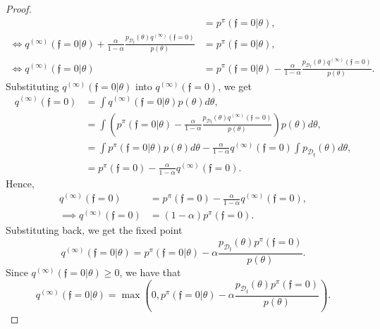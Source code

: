 \documentclass[10pt,a4paper]{amsart}
\newcommand{\MeasuredCISet}{\mathcal{D}_{\feas{}}}
\newcommand{\feas}{\mathfrak{f}}
\begin{document}
\begin{proof}
\begin{align}
    &= p^\pi(\feas{}=0 | \theta), \\
    \iff
    q^{(\infty)}(\feas{}=0 | \theta) + \frac{\alpha}{1-\alpha} \frac{ p_{\MeasuredCISet}(\theta) q^{(\infty)}(\feas{} = 0) }{ p(\theta) }
    &= p^\pi(\feas{}=0 | \theta), \\
    \iff
    q^{(\infty)}(\feas{}=0 | \theta)
    &= p^\pi(\feas{}=0 | \theta) - \frac{\alpha}{1-\alpha} \frac{ p_{\MeasuredCISet}(\theta) q^{(\infty)}(\feas{} = 0) }{ p(\theta) }.
\end{align}
Substituting $q^{(\infty)}(\feas{}=0 | \theta)$ into $q^{(\infty)}(\feas{} = 0)$, we get
\begin{align}
    q^{(\infty)}(\feas{} = 0)
    &= \int q^{(\infty)}(\feas{}=0 | \theta) p(\theta) d\theta, \\
    &= \int \left( p^\pi(\feas{}=0 | \theta) - \frac{\alpha}{1-\alpha} \frac{ p_{\MeasuredCISet}(\theta) q^{(\infty)}(\feas{} = 0) }{ p(\theta) } \right) p(\theta) d\theta, \\
    &= \int p^\pi(\feas{}=0 | \theta) p(\theta) d\theta - \frac{\alpha}{1-\alpha} q^{(\infty)}(\feas{} = 0) \int p_{\MeasuredCISet}(\theta) d\theta, \\
    &= p^\pi(\feas{}=0) - \frac{\alpha}{1-\alpha} q^{(\infty)}(\feas{} = 0).
\end{align}
Hence,
\begin{align}
    q^{(\infty)}(\feas{} = 0)
    &= p^\pi(\feas{}=0) - \frac{\alpha}{1-\alpha} q^{(\infty)}(\feas{} = 0), \\
    \implies
    q^{(\infty)}(\feas{} = 0)
    &= (1-\alpha) p^\pi(\feas{}=0).
\end{align}
Substituting back, we get the fixed point
\begin{equation}
    q^{(\infty)}(\feas{}=0 | \theta)
    = p^\pi(\feas{}=0 | \theta) - \alpha \frac{ p_{\MeasuredCISet}(\theta) p^\pi(\feas{}=0) }{ p(\theta) }.
\end{equation}
Since $q^{(\infty)}(\feas{}=0 | \theta) \geq 0$, we have that
\begin{equation}
    q^{(\infty)}(\feas{}=0 | \theta) = \max \left( 0, p^\pi(\feas{}=0 | \theta) - \alpha \frac{ p_{\MeasuredCISet}(\theta) p^\pi(\feas{}=0) }{ p(\theta) } \right).
\end{equation}
\end{proof}
\end{document}
